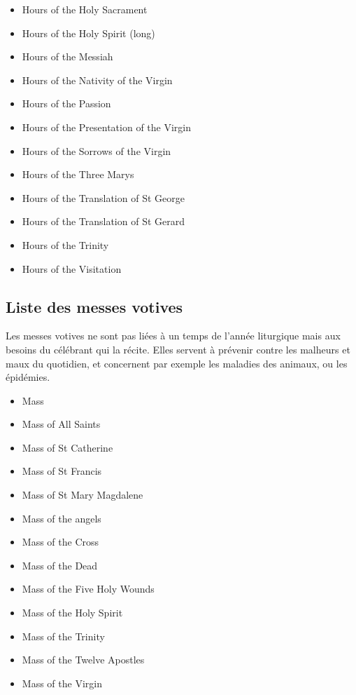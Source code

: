 \documentclass[a4paper,12pt,twoside]{book}
\begin{document}
\begin{multicols}{2}
\begin{itemize}
\item Hours of the Holy Sacrament
\item Hours of the Holy Spirit (long)
\item Hours of the Messiah
\item Hours of the Nativity of the Virgin
\item Hours of the Passion
\item Hours of the Presentation of the Virgin
\item Hours of the Sorrows of the Virgin
\item Hours of the Three Marys
\item Hours of the Translation of St George
\item Hours of the Translation of St Gerard
\item Hours of the Trinity
\item Hours of the Visitation
	\end{itemize}
	\end{multicols}
	
	\subsection{Liste des messes votives}
	
	Les messes votives ne sont pas liées à un temps de l'année liturgique mais aux besoins du célébrant qui la récite. Elles servent à prévenir contre les malheurs et maux du quotidien, et concernent par exemple les maladies des animaux, ou les épidémies. 
	
	\begin{itemize}
\item Mass
\item Mass of All Saints
\item Mass of St Catherine
\item Mass of St Francis
\item Mass of St Mary Magdalene
\item Mass of the angels
\item Mass of the Cross
\item Mass of the Dead
\item Mass of the Five Holy Wounds
\item Mass of the Holy Spirit
\item Mass of the Trinity
\item Mass of the Twelve Apostles
\item Mass of the Virgin
	\end{itemize}
	
\end{document}

